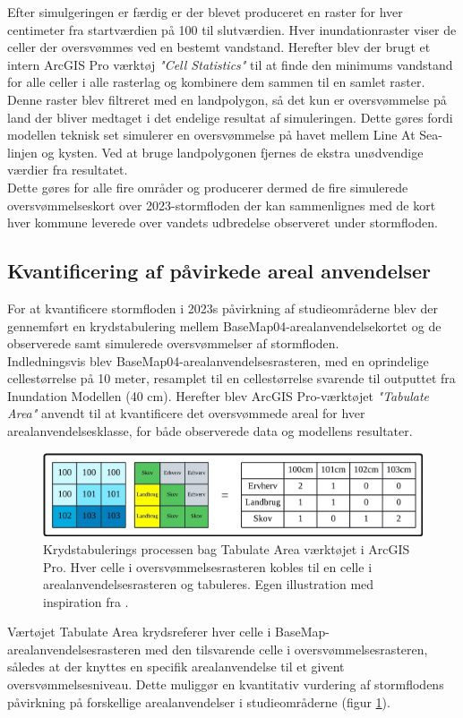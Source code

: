 Efter simulgeringen er færdig er der blevet produceret en raster for hver centimeter fra startværdien på 100 til slutværdien. Hver inundationraster viser de celler der oversvømmes ved en bestemt vandstand. Herefter blev der brugt et intern ArcGIS Pro værktøj \textit{"Cell Statistics"} til at finde den minimums vandstand for alle celler i alle rasterlag og kombinere dem sammen til en samlet raster. Denne raster blev filtreret med en landpolygon, så det kun er oversvømmelse på land der bliver medtaget i det endelige resultat af simuleringen. Dette gøres fordi modellen teknisk set simulerer en oversvømmelse på havet mellem Line At Sea-linjen og kysten. Ved at bruge landpolygonen fjernes de ekstra unødvendige værdier fra resultatet.\\
Dette gøres for alle fire områder og producerer dermed de fire simulerede oversvømmelseskort over 2023-stormfloden der kan sammenlignes med de kort hver kommune leverede over vandets udbredelse observeret under stormfloden.  


\subsection{Kvantificering af påvirkede areal anvendelser} \label{Afsnit: Udregning af påvirkede areal anvendelser}

For at kvantificere stormfloden i 2023s påvirkning af studieområderne blev der gennemført en krydstabulering mellem BaseMap04-arealanvendelsekortet og de observerede samt simulerede oversvømmelser af stormfloden.\\

Indledningsvis blev BaseMap04-arealanvendelsesrasteren, med en oprindelige cellestørrelse på 10 meter, resamplet til en cellestørrelse svarende til outputtet fra Inundation Modellen (40 cm). Herefter blev ArcGIS Pro-værktøjet \textit{"Tabulate Area"} anvendt til at kvantificere det oversvømmede areal for hver arealanvendelsesklasse, for både observerede data og modellens resultater.
 
\begin{figure}[H]
    \centering
    \includegraphics[width=1\linewidth]{images/metode/tabulate.jpg}
    \caption{Krydstabulerings processen bag Tabulate Area værktøjet i ArcGIS Pro. Hver celle i oversvømmelsesrasteren kobles til en celle i arealanvendelsesrasteren og tabuleres. Egen illustration med inspiration fra \cite{esri_tabulate_nodate}.}
    \label{Figur: Tabulate}
\end{figure}
Værtøjet Tabulate Area krydsreferer hver celle i BaseMap-arealanvendelsesrasteren med den tilsvarende celle i oversvømmelsesrasteren, således at der knyttes en specifik arealanvendelse til et givent oversvømmelsesniveau. Dette muliggør en kvantitativ vurdering af stormflodens påvirkning på forskellige arealanvendelser i studieområderne (figur \ref{Figur: Tabulate}).\\

